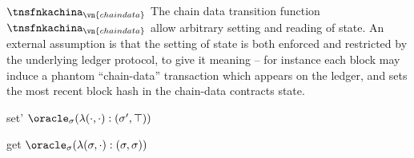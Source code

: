\begin{transitionfn}{$\tnsfnkachina_{\vn{chaindata}}$}
  The chain data transition function $\tnsfnkachina_{\vn{chaindata}}$ allow
  arbitrary setting and reading of state. An external assumption is that the
  setting of state is both enforced and restricted by the underlying ledger
  protocol, to give it meaning -- for instance each block may induce a phantom
  ``chain-data'' transaction which appears on the ledger, and sets the most
  recent block hash in the chain-data contracts state.

  \vsep

  \begin{receiveinput}{set}{\sigma'}
    \State \Run $\oracle_\sigma(\lambda (\cdot, \cdot): (\sigma', \top))$
  \end{receiveinput}

  \begin{receiveinput}{get}{}
    \State \Return $\oracle_\sigma(\lambda (\sigma, \cdot) : (\sigma, \sigma))$
  \end{receiveinput}
\end{transitionfn}

